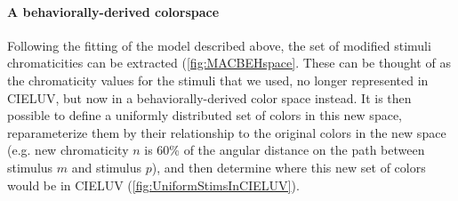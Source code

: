 



\vspace{2em} 

\paragraph{A behaviorally-derived colorspace}

Following the fitting of the model described above, the set of modified stimuli chromaticities can be extracted (\autoref{fig:MACBEHspace}. 
These can be thought of as the chromaticity values for the stimuli that we used, no longer represented in CIELUV, but now in a behaviorally-derived color space instead.
It is then possible to define a uniformly distributed set of colors in this new space, reparameterize them by their relationship to the original colors in the new space (e.g. new chromaticity $n$ is 60\% of the angular distance on the path between stimulus $m$ and stimulus $p$), and then determine where this new set of colors would be in CIELUV (\autoref{fig:UniformStimsInCIELUV}).

%




